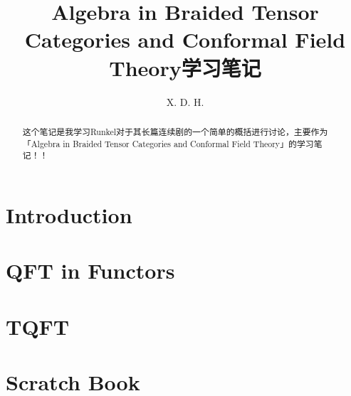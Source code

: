 \documentclass[12pt]{report}
\begin{document}
\title{\boldmath Algebra in  Braided Tensor Categories  and  Conformal Field Theory学习笔记}
\author{X. D. H.}

\maketitle

\begin{abstract}
这个笔记是我学习Runkel对于其长篇连续剧的一个简单的概括进行讨论，主要作为「Algebra in  Braided Tensor Categories  and  Conformal Field Theory」的学习笔记！！
\end{abstract}

\tableofcontents

\chapter{Introduction}


\chapter{QFT in Functors}


\chapter{TQFT}


\chapter{Scratch Book}

\end{document}
